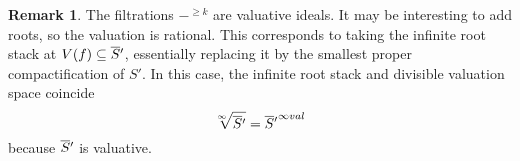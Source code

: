 \documentclass[11pt,reqno]{amsart}
\theoremstyle{definition}
\newtheorem{remark}[theorem]{Remark}
\def\overnorm#1{\overline{#1}\vphantom{#1}}
\renewcommand{\bar}[1]{\ensuremath{\overnorm{#1}}}
\begin{document}
\begin{remark}

The filtrations $-^{\geq k}$ are valuative ideals. It may be interesting to add roots, so the valuation is rational. This corresponds to taking the infinite root stack at $V(f) \subseteq \bar S'$, essentially replacing it by the smallest proper compactification of $S'$. In this case, the infinite root stack and divisible valuation space coincide
\[\sqrt[\infty]{\bar S'} = {\bar S'}^{\infty val}\]
because $\bar S'$ is valuative. 


\end{remark}




\end{document}
